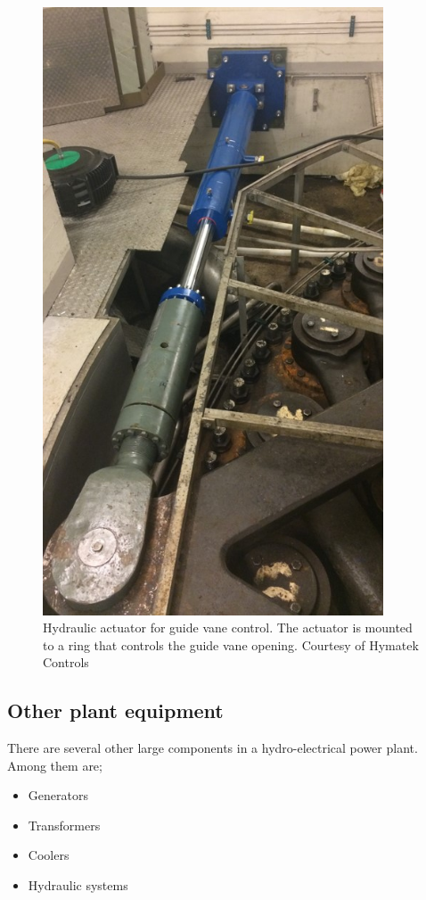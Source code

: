 \begin{figure}
\begin{minipage}[b]{0.49\linewidth}
                \includegraphics[width = 0.9\textwidth]{report/figures/introduction/servo1(1).jpg}
                \caption{Hydraulic actuator for guide vane control. The actuator is mounted to a ring that controls the guide vane opening. Courtesy of Hymatek Controls}
                \label{fig:guide_vanes}
            \end{minipage}
        \end{figure}
        
    \subsection{Other plant equipment}
        There are several other large components in a hydro-electrical power plant. Among them are;
        \begin{itemize}
            \item Generators
            \item Transformers
            \item Coolers
            \item Hydraulic systems
        \end{itemize}
    
